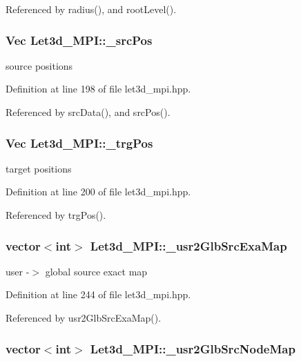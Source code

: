 Referenced by radius(), and root\-Level().
\subsubsection{\setlength{\rightskip}{0pt plus 5cm}Vec {\bf Let3d\_\-MPI::\_\-src\-Pos}\hspace{0.3cm}{\tt  [protected]}}\label{classLet3d__MPI_f66b814fdf8eb17df56ff5ff27a368da_f66b814fdf8eb17df56ff5ff27a368da}


source positions 

Definition at line 198 of file let3d\_\-mpi.hpp.

Referenced by src\-Data(), and src\-Pos().
\subsubsection{\setlength{\rightskip}{0pt plus 5cm}Vec {\bf Let3d\_\-MPI::\_\-trg\-Pos}\hspace{0.3cm}{\tt  [protected]}}\label{classLet3d__MPI_a1b44c7c6fd0a38be167c34537b1a508_a1b44c7c6fd0a38be167c34537b1a508}


target positions 

Definition at line 200 of file let3d\_\-mpi.hpp.

Referenced by trg\-Pos().
\subsubsection{\setlength{\rightskip}{0pt plus 5cm}vector$<$int$>$ {\bf Let3d\_\-MPI::\_\-usr2Glb\-Src\-Exa\-Map}\hspace{0.3cm}{\tt  [protected]}}\label{classLet3d__MPI_3b7641e9deda6229d06f942bc8630af4_3b7641e9deda6229d06f942bc8630af4}


user -$>$ global source exact map 

Definition at line 244 of file let3d\_\-mpi.hpp.

Referenced by usr2Glb\-Src\-Exa\-Map().
\subsubsection{\setlength{\rightskip}{0pt plus 5cm}vector$<$int$>$ {\bf Let3d\_\-MPI::\_\-usr2Glb\-Src\-Node\-Map}\hspace{0.3cm}{\tt  [protected]}}\label{classLet3d__MPI_19819d08b8186a0f19c0af9442ddc0f4_19819d08b8186a0f19c0af9442ddc0f4}


